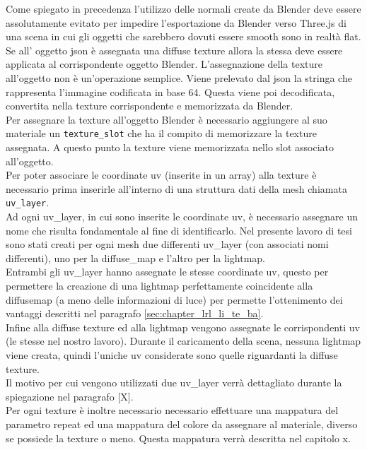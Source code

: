 Come spiegato in precedenza l’utilizzo delle normali create da Blender deve essere assolutamente evitato per impedire l’esportazione da Blender verso Three.js di una scena in cui gli oggetti che sarebbero dovuti essere smooth sono in realtà flat.
\\
Se all’ oggetto json è assegnata una diffuse texture allora la stessa deve essere applicata al corrispondente oggetto Blender. L’assegnazione della texture all’oggetto non è un’operazione semplice. 
Viene prelevato dal json la stringa che rappresenta l’immagine codificata in base 64. Questa viene poi decodificata, convertita nella texture corrispondente e memorizzata da Blender.
\\
Per assegnare la texture all’oggetto Blender è necessario aggiungere al suo materiale un \texttt{texture\_slot} che ha il compito di memorizzare la texture assegnata. 
A questo punto la texture viene memorizzata nello slot associato all’oggetto.
\\
Per poter associare le coordinate uv (inserite in un array) alla texture è necessario prima inserirle all’interno di una struttura dati della mesh chiamata \texttt{uv\_layer}.
\\
Ad ogni uv\_layer, in cui sono inserite le coordinate uv, è necessario assegnare un nome che risulta fondamentale al fine di identificarlo.
Nel presente lavoro di tesi sono stati creati per ogni mesh due differenti uv\_layer (con associati nomi differenti), uno per la diffuse\_map e l’altro per la lightmap.
\\
Entrambi gli uv\_layer hanno assegnate le stesse coordinate uv, questo per permettere la creazione di una lightmap perfettamente coincidente alla diffusemap (a meno delle informazioni di luce) per permette l’ottenimento dei vantaggi descritti nel paragrafo \ref{sec:chapter_lrl_li_te_ba}.
\\
Infine alla diffuse texture ed alla lightmap vengono assegnate le corrispondenti uv (le stesse nel nostro lavoro).
Durante il caricamento della scena, nessuna lightmap viene creata, quindi l’uniche uv considerate sono quelle riguardanti la diffuse texture.
\\
Il motivo per cui vengono utilizzati due uv\_layer verrà dettagliato durante la spiegazione nel paragrafo [X].
\\
Per ogni texture è inoltre necessario necessario effettuare una mappatura del parametro repeat ed una mappatura del colore da assegnare al materiale, diverso se possiede la texture o meno. Questa mappatura verrà descritta nel capitolo x.

